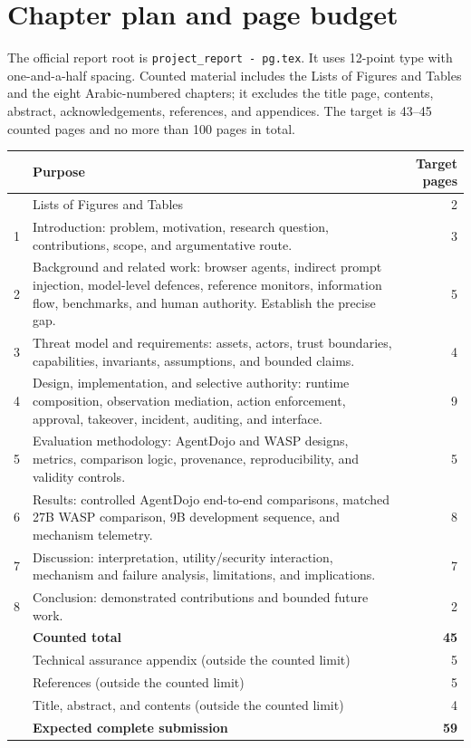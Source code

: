 \documentclass[10pt,a4paper]{article}
\begin{document}
\section{Chapter plan and page budget}

The official report root is \texttt{project\_report - pg.tex}. It uses
12-point type with one-and-a-half spacing. Counted material includes the Lists
of Figures and Tables and the eight Arabic-numbered chapters; it excludes the
title page, contents, abstract, acknowledgements, references, and appendices.
The target is 43--45 counted pages and no more than 100 pages in total.

\begin{longtable}{@{}p{}p{}r@{}}
\toprule
 & Purpose & Target pages \\
\midrule
\endhead
 & Lists of Figures and Tables & 2 \\
1 & Introduction: problem, motivation, research question, contributions, scope,
and argumentative route. & 3 \\
2 & Background and related work: browser agents, indirect prompt injection,
model-level defences, reference monitors, information flow, benchmarks, and
human authority. Establish the precise gap. & 5 \\
3 & Threat model and requirements: assets, actors, trust boundaries,
capabilities, invariants, assumptions, and bounded claims. & 4 \\
4 & Design, implementation, and selective authority: runtime composition,
observation mediation, action enforcement, approval, takeover, incident,
auditing, and interface. & 9 \\
5 & Evaluation methodology: AgentDojo and WASP designs, metrics, comparison
logic, provenance, reproducibility, and validity controls. & 5 \\
6 & Results: controlled AgentDojo end-to-end comparisons,
matched 27B WASP comparison, 9B development sequence, and mechanism telemetry.
& 8 \\
7 & Discussion: interpretation, utility/security interaction, mechanism and
failure analysis, limitations, and implications. & 7 \\
8 & Conclusion: demonstrated contributions and bounded future work. & 2 \\
 & \textbf{Counted total} & \textbf{45} \\
\midrule
 & Technical assurance appendix (outside the counted limit) & 5 \\
 & References (outside the counted limit) & 5 \\
 & Title, abstract, and contents (outside the counted limit) & 4 \\
\midrule
 & \textbf{Expected complete submission} & \textbf{59} \\
\bottomrule
\end{longtable}
\end{document}
